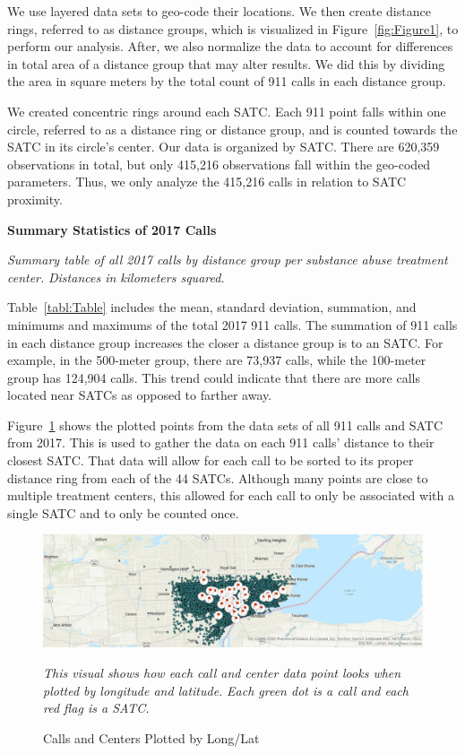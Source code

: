 \documentclass[12pt]{article}
\begin{document}
We use layered data sets to geo-code their locations. We then create distance rings, referred to as distance groups, which is visualized in Figure~\ref{fig:Figure1}, to perform our analysis. After, we also normalize the data to account for differences in total area of a distance group that may alter results. We did this by dividing the area in square meters by the total count of 911 calls in each distance group.

We created concentric rings around each SATC. Each 911 point falls within one circle, referred to as a distance ring or distance group, and is counted towards the SATC in its circle's center. Our data is organized by SATC. There are 620,359 observations in total, but only 415,216 observations fall within the geo-coded parameters. Thus, we only analyze the 415,216 calls in relation to SATC proximity. 
\begin{table}[h]
\centering
\scalebox{0.8}{
\centering

}


\caption{\textbf{Summary Statistics of 2017 Calls}}
\label{tabl:Table}
\centering\textit{Summary table of all 2017 calls by distance group per substance abuse treatment center.}
\textit{Distances in kilometers squared.}
\end{table}

Table~\ref{tabl:Table} includes the mean, standard deviation, summation, and minimums and maximums of the total 2017 911 calls. The summation of 911 calls in each distance group increases the closer a distance group is to an SATC. For example, in the 500-meter group, there are 73,937 calls, while the 100-meter group has 124,904 calls. This trend could indicate that there are more calls located near SATCs as opposed to farther away. 

Figure~\ref{fig:Figure2} shows the plotted points from the data sets of all 911 calls and SATC from 2017. This is used to gather the data on each 911 calls' distance to their closest SATC. That data will allow for each call to be sorted to its proper distance ring from each of the 44 SATCs. Although many points are close to multiple treatment centers, this allowed for each call to only be associated with a single SATC and to only be counted once.

\begin{figure}[h!]
    \centering
\includegraphics[width=0.75\linewidth]{Reproducibility Package/Visual Graphics/ArcGIS_Map.jpg}
    \caption{Calls and Centers Plotted by Long/Lat}
    \label{fig:Figure2}
     \textit{This visual shows how each call and center data point looks when plotted by longitude and latitude.}
     \textit{Each green dot is a call and each red flag is a SATC.}
    
\end{figure}
\end{document}
